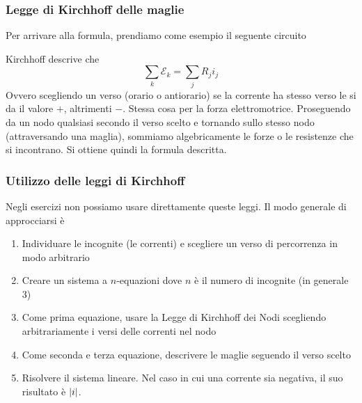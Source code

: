 \subsubsection{Legge di Kirchhoff delle maglie}
Per arrivare alla formula, prendiamo come esempio il seguente circuito
\begin{center}
\end{center}
Kirchhoff descrive che
\begin{equation*}
  \sum_k \mathcal{E}_k = \sum_j R_ji_j
\end{equation*}
Ovvero scegliendo un verso (orario o antiorario) se la corrente ha stesso verso le si da il valore $+$,
altrimenti $-$. Stessa cosa per la forza elettromotrice. Proseguendo da un nodo qualsiasi secondo il
verso scelto e tornando sullo stesso nodo (attraversando una maglia), sommiamo algebricamente le
forze o le resistenze che si incontrano. Si ottiene quindi la formula descritta.

\subsubsection{Utilizzo delle leggi di Kirchhoff}
Negli esercizi non possiamo usare direttamente queste leggi. Il modo generale di approcciarsi è
\begin{enumerate}
  \item Individuare le incognite (le correnti) e scegliere un verso di percorrenza in modo arbitrario
  \item Creare un sistema a $n$-equazioni dove $n$ è il numero di incognite (in generale 3)
  \item Come prima equazione, usare la Legge di Kirchhoff dei Nodi scegliendo arbitrariamente
    i versi delle correnti nel nodo
  \item Come seconda e terza equazione, descrivere le maglie seguendo il verso scelto
  \item Risolvere il sistema lineare. Nel caso in cui una corrente sia negativa, il suo risultato
    è $\lvert i\rvert$.
\end{enumerate}

